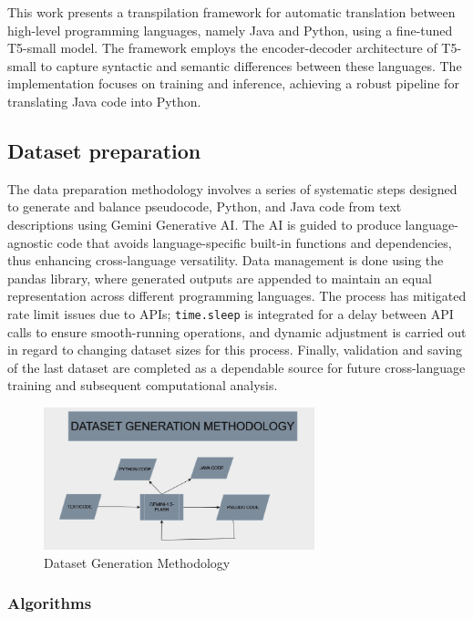 \documentclass{dhbenelux}
\begin{document}
This work presents a transpilation framework for automatic translation between high-level programming languages, namely Java and Python, using a fine-tuned T5-small model. The framework employs the encoder-decoder architecture of T5-small to capture syntactic and semantic differences between these languages. The implementation focuses on training and inference, achieving a robust pipeline for translating Java code into Python.

\subsection{Dataset preparation}
The data preparation methodology involves a series of systematic steps designed to generate and balance pseudocode, Python, and Java code from text descriptions using Gemini Generative AI. The AI is guided to produce language-agnostic code that avoids language-specific built-in functions and dependencies, thus enhancing cross-language versatility. Data management is done using the pandas library, where generated outputs are appended to maintain an equal representation across different programming languages. The process has mitigated rate limit issues due to APIs; \texttt{time.sleep} is integrated for a delay between API calls to ensure smooth-running operations, and dynamic adjustment is carried out in regard to changing dataset sizes for this process. Finally, validation and saving of the last dataset are completed as a dependable source for future cross-language training and subsequent computational analysis.

\begin{figure}[h!]
\centering
\includegraphics[width=0.7\textwidth]{dataset_methodology.png} %
\caption{Dataset Generation Methodology}
\label{fig:dataset-methodology}
\end{figure}

\subsubsection{Algorithms}
\end{document}
